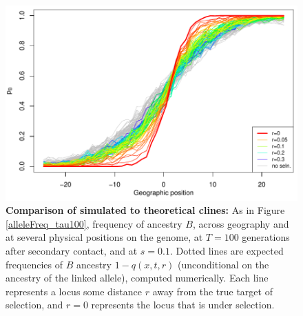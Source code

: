 \begin{figure}
    \includegraphics{figs/alleleFrequencies_sim.pdf}
    \caption{
        \textbf{Comparison of simulated to theoretical clines:}
        As in Figure \ref{alleleFreq_tau100},
        frequency of ancestry $B$,
        across geography and at several physical positions on the genome,
        at $T=100$ generations after secondary contact,
        and at $s=0.1$.
        Dotted lines are expected frequencies of $B$ ancestry $1-q(x,t,r)$
        (unconditional on the ancestry of the linked allele), computed numerically.
        Each line represents a locus some distance $r$ away from the true target of selection, 
        and $r=0$ represents the locus that is under selection.    
    }\label{sfig:alleleFreq_tau100_comparison}
\end{figure}



